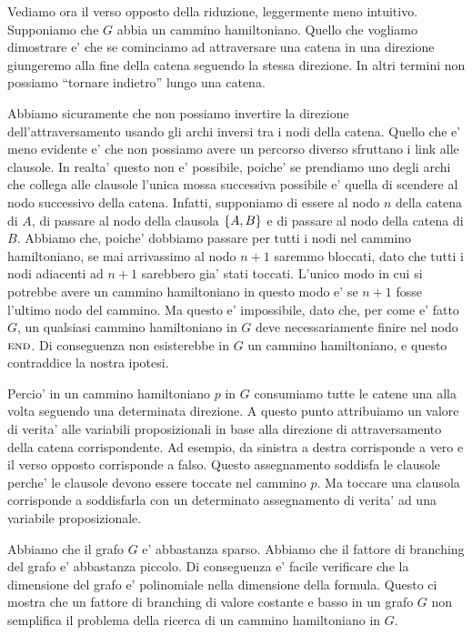 Vediamo ora il verso opposto della riduzione, leggermente meno intuitivo. Supponiamo che $G$ abbia
un cammino hamiltoniano. Quello che vogliamo dimostrare e' che se cominciamo ad attraversare una
catena in una direzione giungeremo alla fine della catena seguendo la stessa direzione. In altri
termini non possiamo ``tornare indietro'' lungo una catena.

Abbiamo sicuramente che non possiamo invertire la direzione dell'attraversamento usando gli archi
inversi tra i nodi della catena. Quello che e' meno evidente e' che non possiamo avere un percorso
diverso sfruttano i link alle clausole. In realta' questo non e' possibile, poiche' se prendiamo uno
degli archi che collega alle clausole l'unica mossa successiva possibile e' quella di scendere al
nodo successivo della catena. Infatti, supponiamo di essere al nodo $n$ della catena di $A$, di
passare al nodo della clausola $\left\{A,B\right\}$ e di passare al nodo della catena di $B$.  Abbiamo che,
poiche' dobbiamo passare per tutti i nodi nel cammino hamiltoniano, se mai arrivassimo al nodo $n+1$
saremmo bloccati, dato che tutti i nodi adiacenti ad $n+1$ sarebbero gia' stati toccati. L'unico
modo in cui si potrebbe avere un cammino hamiltoniano in questo modo e' se $n+1$ fosse l'ultimo nodo
del cammino. Ma questo e' impossibile, dato che, per come e' fatto $G$, un qualsiasi cammino
hamiltoniano in $G$ deve necessariamente finire nel nodo $\textsc{end}$. Di conseguenza non
esisterebbe in $G$ un cammino hamiltoniano, e questo contraddice la nostra ipotesi.

Percio' in un cammino hamiltoniano $p$ in $G$ consumiamo tutte le catene una alla volta seguendo una
determinata direzione. A questo punto attribuiamo un valore di verita' alle variabili proposizionali
in base alla direzione di attraversamento della catena corrispondente. Ad esempio, da sinistra a
destra corrisponde a vero e il verso opposto corrisponde a falso. Questo assegnamento soddisfa le
clausole perche' le clausole devono essere toccate nel cammino $p$. Ma toccare una clausola
corrisponde a soddisfarla con un determinato assegnamento di verita' ad una variabile
proposizionale.

Abbiamo che il grafo $G$ e' abbastanza sparso. Abbiamo che il fattore di branching del grafo e'
abbastanza piccolo. Di conseguenza e' facile verificare che la dimensione del grafo e' polinomiale
nella dimensione della formula. Questo ci mostra che un fattore di branching di valore costante e
basso in un grafo $G$ non semplifica il problema della ricerca di un cammino hamiltoniano in $G$.

